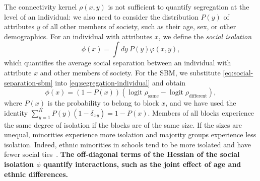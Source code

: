 \documentclass{scrartcl}
\DeclareMathOperator{\logit}{logit}
\newcommand{\change}[1]{\textbf{#1}}
\begin{document}
\begin{refsection}
The connectivity kernel $\rho(x, y)$ is not sufficient to quantify segregation at the level of an individual: we also need to consider the distribution $P(y)$ of attributes $y$ of all other members of society, such as their age, sex, or other demographics. For an individual with attributes $x$, we define the \emph{social isolation}
\begin{equation}
    \phi(x) = \int dy \ P(y) \varphi(x, y),\label{eq:segregation-individual}
\end{equation}
which quantifies the average social separation between an individual with attribute $x$ and other members of society. For the SBM, we substitute \cref{eq:social-separation-sbm} into \cref{eq:segregation-individual} and obtain
\begin{equation}
    \phi(x) = (1-P(x))\left(\logit\rho_\mathrm{same}-\logit\rho_\mathrm{different}\right),\label{eq:segregation-individual-sbm}
\end{equation}
where $P(x)$ is the probability to belong to block $x$, and we have used the identity $\sum_{y=1}^K P(y)\left(1-\delta_{xy}\right)= 1 - P(x)$. Members of all blocks experience the same degree of isolation if the blocks are of the same size. If the sizes are unequal, minorities experience more isolation and majority groups experience less isolation. Indeed, ethnic minorities in schools tend to be more isolated and have fewer social ties~\cite{Currarini2009}. \change{The off-diagonal terms of the Hessian of the social isolation $\phi$ quantify interactions, such as the joint effect of age and ethnic differences.}


\end{refsection}
\end{document}
